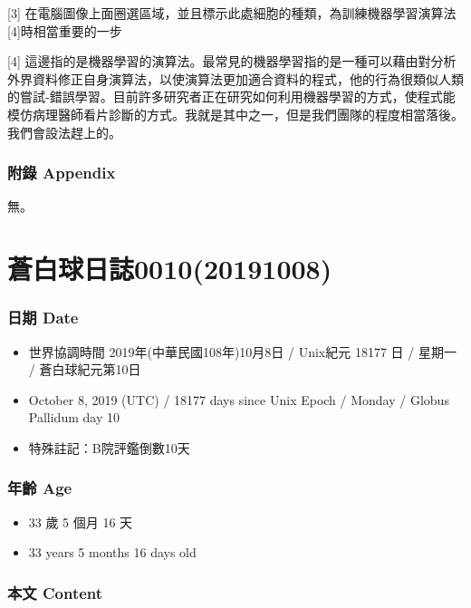 \documentclass[a5paper, 12pt
]{book}
\providecommand{\tightlist}{%
  \setlength{\itemsep}{0pt}\setlength{\parskip}{0pt}}
\begin{document}
{[}3{]}
在電腦圖像上面圈選區域，並且標示此處細胞的種類，為訓練機器學習演算法{[}4{]}時相當重要的一步

{[}4{]}
這邊指的是機器學習的演算法。最常見的機器學習指的是一種可以藉由對分析外界資料修正自身演算法，以使演算法更加適合資料的程式，他的行為很類似人類的嘗試-錯誤學習。目前許多研究者正在研究如何利用機器學習的方式，使程式能模仿病理醫師看片診斷的方式。我就是其中之一，但是我們團隊的程度相當落後。我們會設法趕上的。

\hypertarget{ux9644ux9304-appendix-2}{%
\subsubsection{附錄 Appendix}\label{ux9644ux9304-appendix-2}}

無。

\hypertarget{ux84bcux767dux7403ux65e5ux8a8c001020191008}{%
\section{蒼白球日誌0010(20191008)}\label{ux84bcux767dux7403ux65e5ux8a8c001020191008}}

\hypertarget{ux65e5ux671f-date-7}{%
\subsubsection{日期 Date}\label{ux65e5ux671f-date-7}}

\begin{itemize}
\tightlist
\item
  世界協調時間 2019年(中華民國108年)10月8日 / Unix紀元 18177 日 / 星期一
  / 蒼白球紀元第10日
\item
  October 8, 2019 (UTC) / 18177 days since Unix Epoch / Monday / Globus
  Pallidum day 10
\item
  特殊註記：B院評鑑倒數10天
\end{itemize}

\hypertarget{ux5e74ux9f61-age-7}{%
\subsubsection{年齡 Age}\label{ux5e74ux9f61-age-7}}

\begin{itemize}
\tightlist
\item
  33 歲 5 個月 16 天
\item
  33 years 5 months 16 days old
\end{itemize}

\hypertarget{ux672cux6587-content-7}{%
\subsubsection{本文 Content}\label{ux672cux6587-content-7}}
\end{document}
